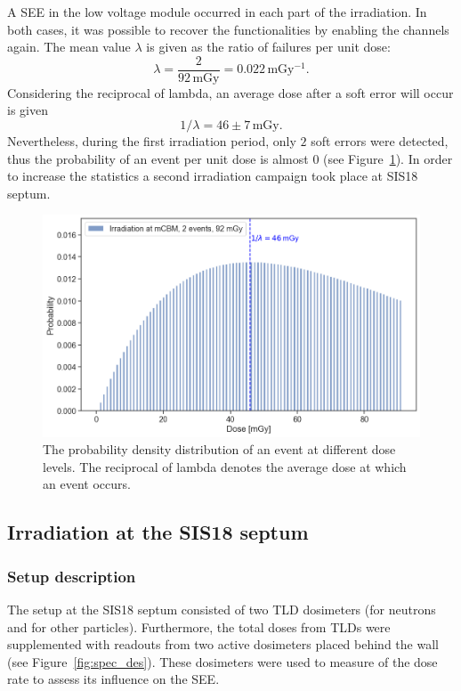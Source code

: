 A \gls{SEE} in the low voltage module occurred in each part of the irradiation. In both cases, it was possible to recover the functionalities by enabling the channels again. The mean value $\lambda$ is given as the ratio of failures per unit dose:
\begin{equation}
    \lambda = \frac{2}{92\,\mathrm{mGy}} = 0.022\,\mathrm{mGy^{-1}}.
\end{equation}
Considering the reciprocal of lambda,  an average dose after a soft error will occur is given 
\begin{equation}
    1/\lambda = 46\pm 7\,\mathrm{mGy}.
\end{equation}
Nevertheless, during the first irradiation period, only $2$ soft errors were detected, thus the probability of an event per unit dose is almost 0 (see Figure~\ref{fig:crate_prob}). In order to increase the statistics a second irradiation campaign took place at SIS18 septum.

\begin{figure}[!h]
    \centering
    \includegraphics[width=0.65\columnwidth]{Chapter4/images/MCBM_crate.png}
    \caption{The probability density distribution of an event at different dose levels. The reciprocal of lambda denotes the average dose at which an event occurs.}
    \label{fig:crate_prob}
\end{figure}



\subsection{Irradiation at the SIS18 septum}
\subsubsection{Setup description}
The setup at the SIS18 septum consisted of two \gls{TLD} dosimeters (for neutrons and for other particles). Furthermore, the total doses from TLDs were supplemented with readouts from two active dosimeters placed behind the wall (see Figure~\ref{fig:spec_des}). These dosimeters were used to measure of the dose rate to assess its influence on the \gls{SEE}.

